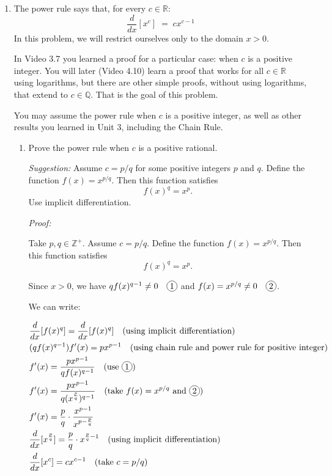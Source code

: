 \documentclass[12pt]{exam}
\newcommand*\circled[1]{\tikz[baseline=(char.base)]{
    \node[shape=circle, draw, inner sep=1pt, 
        minimum height=12pt] (char) {#1};}}
\newcommand{\vv}{\vspace{.4cm}}
\newcommand{\R}{\mathbb{R}}
\newcommand{\Q}{\mathbb{Q}}
\newcommand{\Z}{\mathbb{Z}}
\begin{document}
\begin{enumerate}[resume]
\newpage

\item \label{qu:power}  The power rule says that, for every $c \in \R$:
	$$
		\frac{d}{dx} \left[ x^c \right]  \; = \; c x^{c-1}
	$$
In this problem, we will restrict ourselves only to the domain $x>0$.

In Video 3.7 you learned a proof for a particular case: when $c$ is a positive integer.  You will later (Video 4.10) learn a proof that works for all $c \in \R$ using logarithms, but there are other simple proofs, without using logarithms, that extend to $c \in \Q$.  That is the goal of this problem.
	
You may assume the power rule when $c$ is a positive integer, as well as other results you learned in Unit 3, including the Chain Rule.
	\begin{enumerate}
		\item  Prove the power rule when $c$ is a positive rational.
		
		\emph{Suggestion:}  Assume $c=p/q$ for some positive integers $p$ and $q$.    Define the function $f(x)=x^{p/q}$.  Then this function satisfies
			$$
				f(x)^q = x^p.
			$$
			Use implicit differentiation.

		\vv

			
		\emph{Proof: }

		Take $p, q \in \Z^+$. Assume $c=p/q$. Define the function $f(x)=x^{p/q}$.  Then this function satisfies
		$$
			f(x)^q = x^p. 
		$$

		Since $x > 0$, we have $qf(x)^{q - 1} \neq 0 \quad \circled{1}$ and $f(x)=x^{p/q} \neq 0 \quad \circled{2}$.

		We can write:

		\begin{align*}
			& \frac{d}{dx}[f(x)^q] = \frac{d}{dx}[f(x)^q] \quad \mbox{(using implicit differentiation)} \\
			& (qf(x)^{q-1} )f'(x) = px^{p-1}  \quad \mbox{(using chain rule and power rule for positive integer)} \\
			& f'(x) = \frac{px^{p-1}}{qf(x)^{q-1}} \quad \mbox{(use } \circled{1} \mbox{)} \\
			& f'(x) = \frac{px^{p-1}}{q(x^{\frac{p}{q}})^{q-1}} \quad \mbox{(take } f(x)=x^{p/q} \mbox{ and \circled{2})} \\
			& f'(x) = \frac{p}{q} \cdot \frac{x^{p - 1}}{x^{p - \frac{p}{q}}} \\
			& \frac{d}{dx}[x^\frac{p}{q}] = \frac{p}{q} \cdot x^{\frac{p}{q} - 1} \quad \mbox{(using implicit differentiation)} \\
			& \frac{d}{dx}[x^c] = c x^{c-1} \quad \mbox{(take $c=p/q$)}
		\end{align*}


\end{enumerate}
\end{enumerate}
\end{document}
